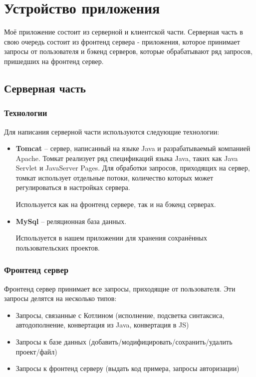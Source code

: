 \chapter{Устройство приложения}
Моё приложение состоит из серверной и клиентской части. Серверная часть в свою очередь состоит из фронтенд сервера - приложения, которое принимает запросы от пользователя и бэкенд серверов, которые обрабатывают ряд запросов, пришедших на фронтенд сервер.


	
\section{Серверная часть}
\subsection{Технологии}
	Для написания серверной части используются следующие технологии:
\begin{itemize}
	\item \textbf{Tomcat} -- сервер, написанный на языке Java и разрабатываемый компанией Apache. Томкат реализует ряд спецификаций языка Java, таких как Java Servlet и JavaServer Pages. Для обработки запросов, приходящих на сервер, томкат использует отдельные потоки, количество которых может регулироваться в настройках сервера. 
	
	Используется как на фронтенд сервере, так и на бэкенд серверах.
	\item \textbf{MySql} -- реляционная база данных. 
	
	Используется в нашем приложении для хранения сохранённых пользовательских проектов.
\end{itemize}


\subsection{Фронтенд сервер}
	Фронтенд сервер принимает все запросы, приходящие от пользователя. Эти запросы делятся на несколько типов:
\begin{itemize}
	\item Запросы, связанные с Котлином (исполнение, подсветка синтаксиса, автодополнение, конвертация из Java, конвертация в JS)
	\item Запросы  к базе данных (добавить/модифицировать/сохранить/удалить проект/файл)
	\item Запросы к фронтенд серверу (выдать код примера, запросы авторизации)
\end{itemize}

